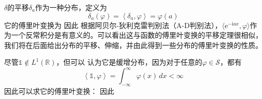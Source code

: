 \begin{example}
    $\delta$的平移$\delta_a$作为一种分布，定义为
\begin{equation}
    \delta_a(\varphi)=\left\langle \delta_a,\varphi\right\rangle=\varphi(a)
\end{equation}
它的傅里叶变换为
因此
根据阿贝尔-狄利克雷判别法（A-D判别法），$\langle \mathrm{e}^{-\mathrm{i} a x},\varphi\rangle$作为一个反常积分是有意义的。可以看出这与函数的傅里叶变换的平移定理很相似，我们将在后面给出分布的平移、伸缩，并由此得到一些分布的傅里叶变换的性质。
\end{example}

\begin{example}
尽管$\mathds{1}\notin L^1(\mathbb{R})$，但可以
认为它是缓增分布，因为对于任意的$\varphi\in\mathcal{S} $，都有
\[\left\langle \mathds{1},\varphi\right\rangle=\int_{-\infty}^{\infty}\varphi(x)\,dx<\infty\]
因此可以求它的傅里叶变换：
因此
\end{example}

